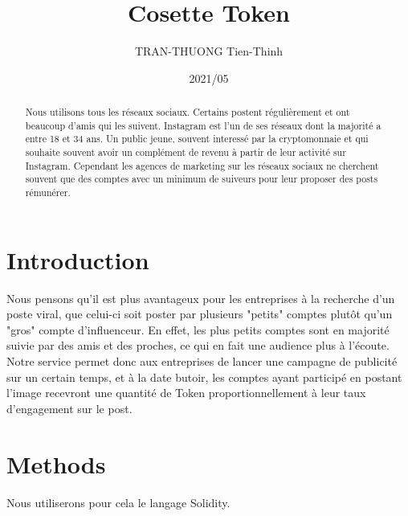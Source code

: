 \documentclass[10pt]{article}
\title{Cosette Token}
\author{TRAN-THUONG Tien-Thinh}
\date{2021/05}
\begin{document}
\maketitle

\begin{abstract}
Nous utilisons tous les réseaux sociaux. Certains postent régulièrement et ont beaucoup d'amis qui les suivent. Instagram est l'un de ses réseaux dont la majorité a entre 18 et 34 ans. Un public jeune, souvent interessé par la cryptomonnaie et qui souhaite souvent avoir un complément de revenu à partir de leur activité sur Instagram. Cependant les agences de marketing sur les réseaux sociaux ne cherchent souvent que des comptes avec un minimum de suiveurs pour leur proposer des posts rémunérer.
\end{abstract}

\section{Introduction}
Nous pensons qu'il est plus avantageux pour les entreprises à la recherche d'un poste viral, que celui-ci soit poster par plusieurs "petits" comptes plutôt qu'un "gros" compte d'influenceur. En effet, les plus petits comptes sont en majorité suivie par des amis et des proches, ce qui en fait une audience plus à l'écoute. Notre service permet donc aux entreprises de lancer une campagne de publicité sur un certain temps, et à la date butoir, les comptes ayant participé en postant l'image recevront une quantité de Token proportionnellement à leur taux d'engagement sur le post.

\section{Methods}
Nous utiliserons pour cela le langage Solidity.  
\end{document}
